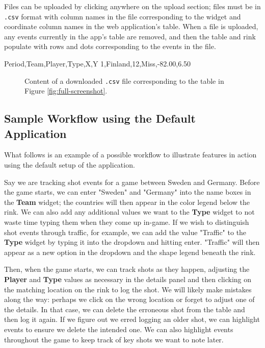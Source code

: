 \documentclass[letterpaper]{article}
\begin{document}
Files can be uploaded by clicking anywhere on the upload section; files must be in \texttt{.csv} format with column names in the file corresponding to the widget and coordinate column names in the web application's table. When a file is uploaded, any events currently in the app's table are removed, and then the table and rink populate with rows and dots corresponding to the events in the file.

\begin{verbbox}
	Period,Team,Player,Type,X,Y
	1,Finland,12,Miss,-82.00,6.50
\end{verbbox}
\begin{figure}[ht]
	\centering
	\theverbbox
	\caption{Content of a downloaded \texttt{.csv} file corresponding to the table in Figure \ref{fig:full-screenshot}.}
	\label{fig:csvoutput}
\end{figure}
\subsection{Sample Workflow using the Default Application}
What follows is an example of a possible workflow to illustrate features in action using the default setup of the application.

Say we are tracking shot events for a game between Sweden and Germany. Before the game starts, we can enter "Sweden" and "Germany" into the name boxes in the \textbf{Team} widget; the countries will then appear in the color legend below the rink. We can also add any additional values we want to the \textbf{Type} widget to not waste time typing them when they come up in-game. If we wish to distinguish shot events through traffic, for example, we can add the value "Traffic" to the \textbf{Type} widget by typing it into the dropdown and hitting enter. "Traffic" will then appear as a new option in the dropdown and the shape legend beneath the rink.

Then, when the game starts, we can track shots as they happen, adjusting the \textbf{Player} and \textbf{Type} values as necessary in the details panel and then clicking on the matching location on the rink to log the shot. We will likely make mistakes along the way: perhaps we click on the wrong location or forget to adjust one of the details. In that case, we can delete the erroneous shot from the table and then log it again. If we figure out we erred logging an older shot, we can highlight events to ensure we delete the intended one. We can also highlight events throughout the game to keep track of key shots we want to note later.
\end{document}
